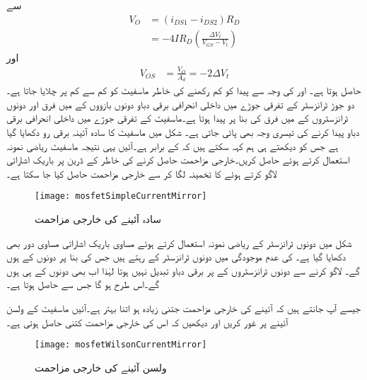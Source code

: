 سے
\begin{align*}
V_O&=\left(i_{DS1}-i_{DS2} \right) R_D\\
&=-4 I R_D\left(\frac{\Delta V_t}{V_{GS}-V_t}\right)
\end{align*}
اور
\begin{align}
V_{OS}&=\frac{V_O}{A_d}=- 2 \Delta V_t
\end{align}
حاصل ہوتا ہے۔
 اور  کی وجہ سے پیدا  کو کم رکھنے کی خاطر ماسفیٹ کو کم سے کم  پر چلایا جاتا ہے۔دو جوڑ ٹرانزسٹر کے تفرقی جوڑے میں داخلی انحرافی برقی دباو دونوں بازووں  کے  میں فرق اور دونوں ٹرانزسٹروں کے  میں فرق کی بنا پر پیدا ہوتا ہے۔ماسفیٹ کے تفرقی جوڑے میں داخلی انحرافی برقی دباو پیدا کرنے کی تیسری وجہ  بھی پائی جاتی ہے۔
شکل  میں ماسفیٹ کا سادہ آئینہ برقی رو دکھایا گیا ہے جس کو دیکھتے ہی ہم کہہ سکتے ہیں کہ  کے برابر ہے۔آئیں یہی نتیجہ ماسفیٹ ریاضی نمونہ استعمال کرتے ہوئے حاصل کریں۔خارجی مزاحمت حاصل کرنے کی خاطر  کے ڈرین پر باریک اشاراتی  لاگو کرتے ہوئے  کا تخمینہ لگا کر  سے خارجی مزاحمت  حاصل کیا جا سکتا ہے۔
\begin{figure}
\centering
\texttt{[image: mosfetSimpleCurrentMirror]}
\caption{سادہ آئینے کی خارجی مزاحمت}
\label{شکل_تفرقی_سادہ_آئینے_کی_خارجی_مزاحمت}
\end{figure}
شکل  میں دونوں ٹرانزسٹر کے ریاضی نمونہ استعمال کرتے ہوئے مساوی باریک اشاراتی مساوی دور بھی دکھایا گیا ہے۔ کی عدم موجودگی میں دونوں ٹرانزسٹر کے  رہتے ہیں جس  کی بنا پر دونوں کے  ہوں گے۔ لاگو کرنے سے دونوں ٹرانزسٹروں کے  پر برقی دباو تبدیل نہیں ہوتا لہٰذا اب بھی دونوں کے   ہی ہوں گے۔اس طرح  ہو گا جس سے  حاصل ہوتا ہے۔

جیسے آپ جانتے ہیں کہ آئینے کی خارجی مزاحمت جتنی زیادہ ہو اتنا بہتر ہے۔آئیں ماسفیٹ کے ولسن آئینے پر غور کریں اور دیکھیں کہ اس کی خارجی مزاحمت کتنی حاصل ہوتی ہے۔
\begin{figure}
\centering
\texttt{[image: mosfetWilsonCurrentMirror]}
\caption{ولسن آئینے کی خارجی مزاحمت}
\label{شکل_تفرقی_ماسفیٹ_ولسن_آئینے_کی_خارجی_مزاحمت}
\end{figure}

